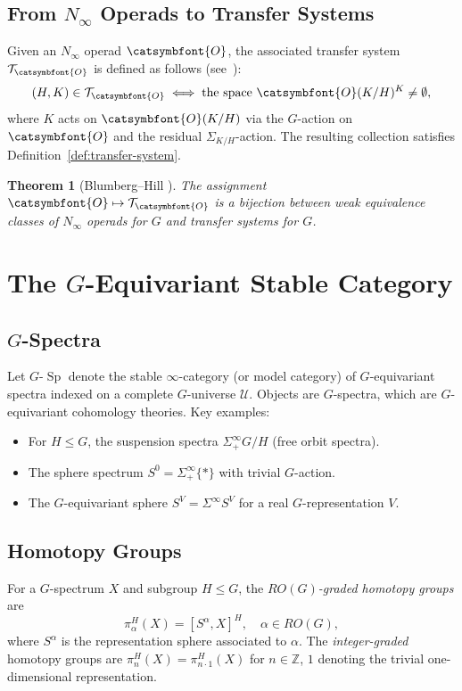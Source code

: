 \documentclass[12pt]{article}
\newcommand{\aO}{{\catsymbfont{O}}}
\newcommand{\aT}{{\mathcal{T}}}
\newcommand{\bZ}{\mathbb{Z}}
\DeclareMathOperator{\Sp}{Sp}
\newcommand{\SpG}{G\text{-}\Sp}
\newtheorem{theorem}{Theorem}
\theoremstyle{definition}
\begin{document}
\subsection{From $N_\infty$ Operads to Transfer Systems}

Given an $N_\infty$ operad $\aO$, the associated transfer system $\aT_\aO$ is defined as follows (see~\cite[{\S}3]{BlumbergHill}):
\[
   (H,K) \in \aT_\aO \iff \text{the space } \aO(K/H)^K \neq \emptyset,
\]
where $K$ acts on $\aO(K/H)$ via the $G$-action on $\aO$ and the residual $\Sigma_{K/H}$-action.  The resulting collection satisfies Definition~\ref{def:transfer-system}.

\begin{theorem}[Blumberg--Hill {\cite[Thm.~1.4]{BlumbergHill}}]
The assignment $\aO \mapsto \aT_\aO$ is a bijection between weak equivalence classes of $N_\infty$ operads for $G$ and transfer systems for $G$.
\end{theorem}

\section{The $G$-Equivariant Stable Category}

\subsection{$G$-Spectra}

Let $\SpG$ denote the stable $\infty$-category (or model category) of $G$-equivariant spectra indexed on a complete $G$-universe $\mathcal{U}$.  Objects are $G$-spectra, which are $G$-equivariant cohomology theories.  Key examples:
\begin{itemize}
\item For $H\leq G$, the suspension spectra $\Sigma^\infty_+ G/H$ (free orbit spectra).
\item The sphere spectrum $S^0 = \Sigma^\infty_+ \{*\}$ with trivial $G$-action.
\item The $G$-equivariant sphere $S^V = \Sigma^\infty S^V$ for a real $G$-representation $V$.
\end{itemize}

\subsection{Homotopy Groups}

For a $G$-spectrum $X$ and subgroup $H\leq G$, the \emph{$RO(G)$-graded homotopy groups} are
\[
   \pi_\alpha^H(X) = [S^\alpha, X]^H, \quad \alpha\in RO(G),
\]
where $S^\alpha$ is the representation sphere associated to $\alpha$.  The \emph{integer-graded} homotopy groups are $\pi_n^H(X) = \pi_{n\cdot 1}^H(X)$ for $n\in\bZ$, $1$ denoting the trivial one-dimensional representation.
\end{document}
